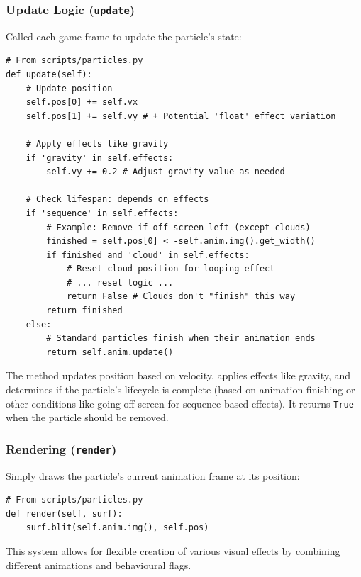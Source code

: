 \documentclass[11pt, a4paper]{article}
\begin{document}
\subsubsection{Update Logic (\texttt{update})}

Called each game frame to update the particle's state:

\begin{lstlisting}[caption={Particle.update() Core Logic}, label={lst:particle_update_short}]
# From scripts/particles.py
def update(self):
    # Update position
    self.pos[0] += self.vx
    self.pos[1] += self.vy # + Potential 'float' effect variation

    # Apply effects like gravity
    if 'gravity' in self.effects:
        self.vy += 0.2 # Adjust gravity value as needed

    # Check lifespan: depends on effects
    if 'sequence' in self.effects:
        # Example: Remove if off-screen left (except clouds)
        finished = self.pos[0] < -self.anim.img().get_width()
        if finished and 'cloud' in self.effects:
            # Reset cloud position for looping effect
            # ... reset logic ...
            return False # Clouds don't "finish" this way
        return finished
    else:
        # Standard particles finish when their animation ends
        return self.anim.update()
\end{lstlisting}

The method updates position based on velocity, applies effects like gravity, and determines if the particle's lifecycle is complete (based on animation finishing or other conditions like going off-screen for sequence-based effects). It returns \texttt{True} when the particle should be removed.

\subsubsection{Rendering (\texttt{render})}

Simply draws the particle's current animation frame at its position:

\begin{lstlisting}[caption={Particle.render() Method}, label={lst:particle_render_short}]
# From scripts/particles.py
def render(self, surf):
    surf.blit(self.anim.img(), self.pos)
\end{lstlisting}

This system allows for flexible creation of various visual effects by combining different animations and behavioural flags.
\end{document}
